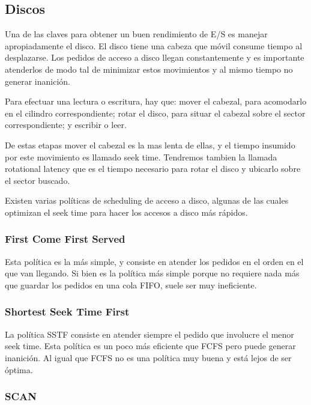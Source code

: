\documentclass{article}
\begin{document}
\subsection{Discos}

Una de las claves para obtener un buen rendimiento de E/S es manejar apropiadamente el disco. El disco tiene una cabeza que móvil consume tiempo al desplazarse. Los pedidos de acceso a disco llegan constantemente y es importante atenderlos de modo tal de minimizar estos movimientos y al mismo tiempo no generar inanici\'on.

Para efectuar una lectura o escritura, hay que: mover el cabezal, para acomodarlo en el cilindro correspondiente; rotar el disco, para situar el cabezal sobre el sector correspondiente; y escribir o leer.

De estas etapas mover el cabezal es la mas lenta de ellas, y el tiempo insumido por este movimiento es llamado seek time. Tendremos tambien la llamada rotational latency que es el tiempo necesario para rotar el disco y ubicarlo sobre el sector buscado.

Existen varias pol\'iticas de scheduling de acceso a disco, algunas de las cuales optimizan el seek time para hacer los accesos a disco m\'as r\'apidos.

\subsubsection{First Come First Served}

Esta pol\'itica es la m\'as simple, y consiste en atender los pedidos en el orden en el que van llegando. Si bien es la pol\'itica m\'as simple porque no requiere nada m\'as que guardar los pedidos en una cola FIFO, suele ser muy ineficiente.

\subsubsection{Shortest Seek Time First}

La pol\'itica SSTF consiste en atender siempre el pedido que involucre el menor seek time. Esta pol\'itica es un poco m\'as eficiente que FCFS pero puede generar inanici\'on. Al igual que FCFS no es una pol\'itica muy buena y est\'a lejos de ser \'optima.

\subsubsection{SCAN}
\end{document}
